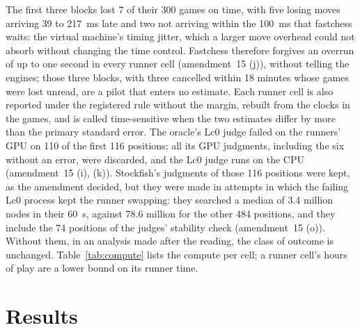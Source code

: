 \documentclass{article}
\newif\iffinal
\newif\ifresults
\newcommand{\pending}[1]{\iffinal\PackageError{paper}{Pending content: #1}{Fill it from the artifact before the final build.}\else\textcolor{red}{[PENDING: #1]}\fi}
\begin{document}
The first three blocks lost 7 of their 300 games on time, with five losing moves arriving 39 to 217~ms late and two not arriving within the 100~ms that fastchess waits: the virtual machine's timing jitter, which a larger move overhead could not absorb without changing the time control. Fastchess therefore forgives an overrun of up to one second in every runner cell (amendment~15 (j)), without telling the engines; those three blocks, with three cancelled within 18 minutes whose games were lost unread, are a pilot that enters no estimate. Each runner cell is also reported under the registered rule without the margin, rebuilt from the clocks in the games, and is called time-sensitive when the two estimates differ by more than the primary standard error. The oracle's Lc0 judge failed on the runners' GPU on 110 of the first 116 positions; all its GPU judgments, including the six without an error, were discarded, and the Lc0 judge runs on the CPU (amendment~15 (i), (k)). Stockfish's judgments of those 116 positions were kept, as the amendment decided, but they were made in attempts in which the failing Lc0 process kept the runner swapping: they searched a median of 3.4 million nodes in their 60~s, against 78.6 million for the other 484 positions, and they include the 74 positions of the judges' stability check (amendment~15 (o)). Without them, in an analysis made after the reading, the class of outcome is unchanged. Table~\ref{tab:compute} lists the compute per cell; a runner cell's hours of play are a lower bound on its runner time.
\begin{table}[t]
\centering
\caption{Compute per cell: games, blocks run, hours of play (the sum of the PGN game durations) and minutes per game; the runner cells follow the workstation's, each block on its own runner. Generated from each cell's \texttt{games.pgn} and \texttt{manifest.json}.}
\label{tab:compute}
\footnotesize
\ifresults\else{}\fi
\end{table}

\section{Results}
\label{sec:results}
\end{document}
